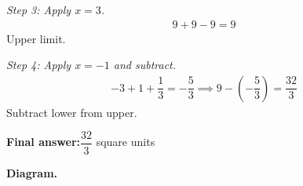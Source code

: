 \documentclass[11pt]{article}
\begin{document}
\textit{Step 3: Apply \( x = 3 \).}
\[\begin{gathered}
9 + 9 - 9 = 9
\end{gathered}\]
Upper limit.

\textit{Step 4: Apply \( x = -1 \) and subtract.}
\[\begin{gathered}
-3 + 1 + \dfrac{1}{3} = -\dfrac{5}{3} \implies 9 - \left(-\dfrac{5}{3}\right) = \dfrac{32}{3}
\end{gathered}\]
Subtract lower from upper.

\begin{answerbox}
\textbf{Final answer:}\quad \(\displaystyle \dfrac{32}{3}\) square units
\end{answerbox}
\textbf{Diagram.}

\begin{center}
\end{center}
\end{document}
